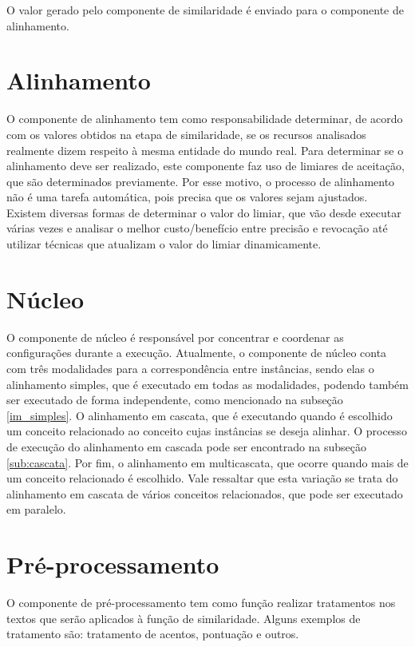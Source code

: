 




O valor gerado pelo componente de similaridade é enviado para o componente de alinhamento.
\section{Alinhamento}
O componente de alinhamento tem como responsabilidade determinar, de acordo com os valores obtidos na etapa de similaridade, se os recursos analisados realmente dizem respeito à mesma entidade do mundo real. Para determinar se o alinhamento deve ser realizado, este componente faz uso de limiares de aceitação, que são determinados previamente. Por esse motivo, o processo de alinhamento não é uma tarefa automática, pois precisa que os valores sejam ajustados. Existem diversas formas de determinar o valor do limiar, que vão desde executar várias vezes e analisar o melhor custo/benefício entre precisão e revocação até utilizar técnicas que atualizam o valor do limiar dinamicamente.


\section{Núcleo}

O componente de núcleo é responsável por concentrar e coordenar as configurações durante a execução. Atualmente, o componente de núcleo conta com três modalidades para a correspondência entre instâncias, sendo elas o alinhamento simples, que é executado em todas as modalidades, podendo também ser executado de forma independente, como mencionado na subseção \ref{im_simples}. O alinhamento em cascata, que é executando quando é escolhido um conceito relacionado ao conceito cujas instâncias se deseja alinhar. O processo de execução do alinhamento em cascada pode ser encontrado na subseção \ref{sub:cascata}. Por fim, o alinhamento em multicascata, que ocorre quando mais de um conceito relacionado é escolhido. Vale ressaltar que esta variação se trata do alinhamento em cascata de vários conceitos relacionados, que pode ser executado em paralelo.

\section{Pré-processamento}
O componente de pré-processamento tem como função realizar tratamentos nos textos que serão aplicados à função de similaridade. Alguns exemplos de tratamento são: tratamento de acentos, pontuação e outros.


